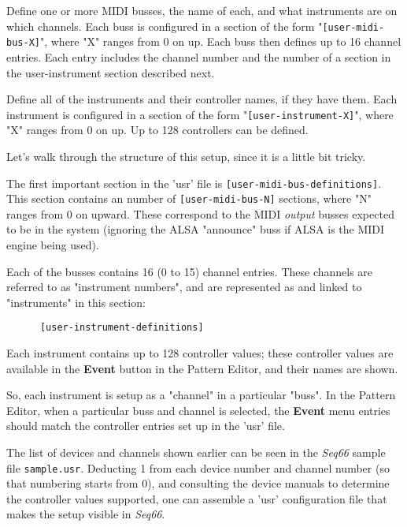    \begin{enumber}
      \item Define one or more MIDI busses, the name of each, and what
         instruments are on which channels.  Each buss is configured in a
         section of the form "\texttt{[user-midi-bus-X]}", where "X" ranges
         from 0 on up.  Each buss then defines up to 16 channel entries.
         Each entry includes the channel number and the number of a
         section in the user-instrument section described next.
      \item Define all of the instruments and their controller
         names, if they have them.  Each instrument is configured in a
         section of the form "\texttt{[user-instrument-X]}", where "X"
         ranges from 0 on up.  Up to 128 controllers can be defined.
   \end{enumber}

   Let's walk through the structure of this setup, since it is a little bit
   tricky.

   The first important section in the 'usr' file
   is \texttt{[user-midi-bus-definitions]}.
   This section contains an number
   of \texttt{[user-midi-bus-N]} sections, where "N" ranges from 0 on upward.
   These correspond to the MIDI \textsl{output}
   busses expected to be in the system (ignoring the ALSA "announce" buss if
   ALSA is the MIDI engine being used).

   Each of the busses contains 16 (0 to 15) channel entries.
   These channels are referred to as "instrument numbers", and are
   represented as and linked to "instruments" in this section:

   \begin{verbatim}
      [user-instrument-definitions]
   \end{verbatim}

   Each instrument contains up
   to 128 controller values; these controller values are available in the
   \textbf{Event} button in the Pattern Editor, and their names are shown.

   So, each instrument is setup as a "channel" in a particular "buss".
   In the Pattern Editor, when a particular buss and channel is selected,
   the \textbf{Event} menu entries should match the controller entries set up
   in the 'usr' file.

   The list of devices and channels shown earlier
   can be seen in the \textsl{Seq66} sample file
   \texttt{sample.usr}.
   Deducting 1 from each device number and channel number (so that numbering
   starts from 0), and consulting the device manuals to determine the
   controller values supported, one can assemble a 'usr' configuration file
   that makes the setup visible in \textsl{Seq66}.

